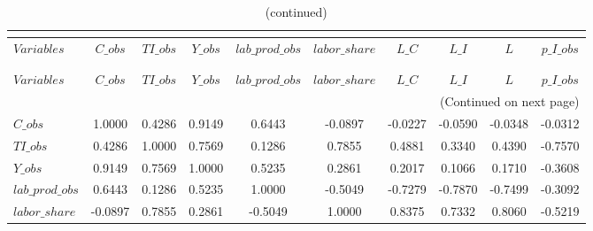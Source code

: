  
\begin{center}
\begin{longtable}{lccccccccc} 
\caption{MATRIX OF CORRELATIONS}\\
 \label{Table:th_corr_matrix}\\
\toprule 
$Variables       $	 & 	 $           C\_obs$	 & 	 $          TI\_obs$	 & 	 $           Y\_obs$	 & 	 $  lab\_prod\_obs$	 & 	 $     labor\_share$	 & 	 $             L\_C$	 & 	 $             L\_I$	 & 	 $                 L$	 & 	 $       p\_I\_obs$\\
\midrule \endfirsthead 
\caption{(continued)}\\
 \toprule \\ 
$Variables       $	 & 	 $           C\_obs$	 & 	 $          TI\_obs$	 & 	 $           Y\_obs$	 & 	 $  lab\_prod\_obs$	 & 	 $     labor\_share$	 & 	 $             L\_C$	 & 	 $             L\_I$	 & 	 $                 L$	 & 	 $       p\_I\_obs$\\
\midrule \endhead 
\midrule \multicolumn{10}{r}{(Continued on next page)} \\ \bottomrule \endfoot 
\bottomrule \endlastfoot 
$C\_obs          $	 & 	            1.0000	 & 	            0.4286	 & 	            0.9149	 & 	            0.6443	 & 	           -0.0897	 & 	           -0.0227	 & 	           -0.0590	 & 	           -0.0348	 & 	           -0.0312 \\ 
$TI\_obs         $	 & 	            0.4286	 & 	            1.0000	 & 	            0.7569	 & 	            0.1286	 & 	            0.7855	 & 	            0.4881	 & 	            0.3340	 & 	            0.4390	 & 	           -0.7570 \\ 
$Y\_obs          $	 & 	            0.9149	 & 	            0.7569	 & 	            1.0000	 & 	            0.5235	 & 	            0.2861	 & 	            0.2017	 & 	            0.1066	 & 	            0.1710	 & 	           -0.3608 \\ 
$lab\_prod\_obs  $	 & 	            0.6443	 & 	            0.1286	 & 	            0.5235	 & 	            1.0000	 & 	           -0.5049	 & 	           -0.7279	 & 	           -0.7870	 & 	           -0.7499	 & 	           -0.3092 \\ 
$labor\_share    $	 & 	           -0.0897	 & 	            0.7855	 & 	            0.2861	 & 	           -0.5049	 & 	            1.0000	 & 	            0.8375	 & 	            0.7332	 & 	            0.8060	 & 	           -0.5219 \\ 

\end{longtable}
\end{center}
